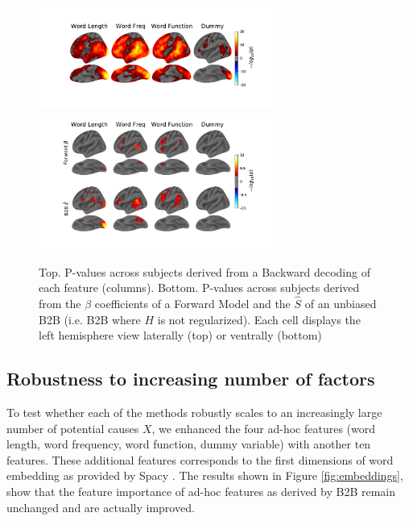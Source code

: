 \begin{figure}
  \begin{center}
    \includegraphics[width=0.7\textwidth,
                     trim=0cm 0cm 0cm 0cm,
                     clip=True]{figures/fmri_decod.pdf}
    \includegraphics[width=0.7\textwidth,
                     trim=0cm 0cm 0cm 0cm,
                     clip=True]{figures/fmri_betas.pdf}

    \label{fig:fmri_supp}
  \end{center}
  \caption{Top. P-values across subjects derived from a Backward decoding of
  each feature (columns). Bottom. P-values across subjects derived from
  the $\beta$ coefficients of a Forward Model and the $\hat S$ of an unbiased
  B2B (i.e. B2B where $H$ is not regularized). Each cell displays the left
  hemisphere view laterally (top) or ventrally (bottom)}
\end{figure}

\subsection{Robustness to increasing number of factors}

To test whether each of the methods robustly scales to an increasingly
large number of potential causes $X$, we enhanced the four ad-hoc features
(word length, word frequency, word function, dummy variable) with another
ten features. These additional features corresponds to the first dimensions
of word embedding as provided by Spacy \citep{spacy2}. The results shown
in Figure \ref{fig:embeddings}, show that the feature importance of ad-hoc
features as derived by B2B remain unchanged and are actually improved.

